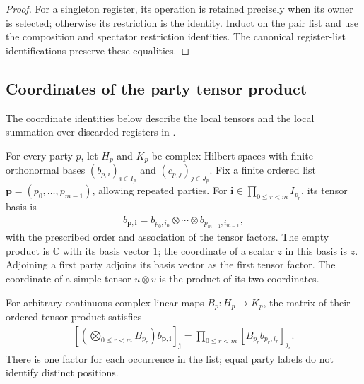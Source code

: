 \begin{proof}
    \leanok
    For a singleton register, its operation is retained precisely when its owner
    is selected; otherwise its restriction is the identity. Induct on the pair
    list and use the composition and spectator restriction identities. The
    canonical register-list identifications preserve these equalities.
\end{proof}

\subsection{Coordinates of the party tensor product}
\label{sec:party-tensor-coordinates}

The coordinate identities below describe the local tensors and the local
summation over discarded registers in
\cite[proof of Theorem~5.2]{OpenAI2026PolynomialPEPS}.

\begin{definition}
    \label{def:party-list-basis}
    \leanok
    For every party $p$, let $H_p$ and $K_p$ be complex Hilbert spaces with
    finite orthonormal bases $(b_{p,i})_{i\in I_p}$ and
    $(c_{p,j})_{j\in J_p}$. Fix a finite ordered list
    $\mathbf p=(p_0,\ldots,p_{m-1})$, allowing repeated parties. For $\mathbf i\in\prod_{0\le r<m}I_{p_r}$, its tensor basis is
    \begin{align}
        b_{\mathbf p,\mathbf i}
        =b_{p_0,i_0}\otimes\cdots\otimes b_{p_{m-1},i_{m-1}},
    \end{align}
    with the prescribed order and association of the tensor factors. The empty
    product is $\mathbb C$ with its basis vector $1$; the coordinate of a scalar
    $z$ in this basis is $z$. Adjoining a first party adjoins its basis vector as
    the first tensor factor. The coordinate of a simple tensor $u\otimes v$
    is the product of its two coordinates.

    For arbitrary continuous complex-linear maps $B_p:H_p\to K_p$, the matrix
    of their ordered tensor product satisfies
    \begin{align}
        \left[\left(\bigotimes_{0\le r<m} B_{p_r}\right)
            b_{\mathbf p,\mathbf i}\right]_{\mathbf j}
        =\prod_{0\le r<m} [B_{p_r}b_{p_r,i_r}]_{j_r}.
    \end{align}
    There is one factor for each occurrence in the list; equal party labels do
    not identify distinct positions.
\end{definition}

